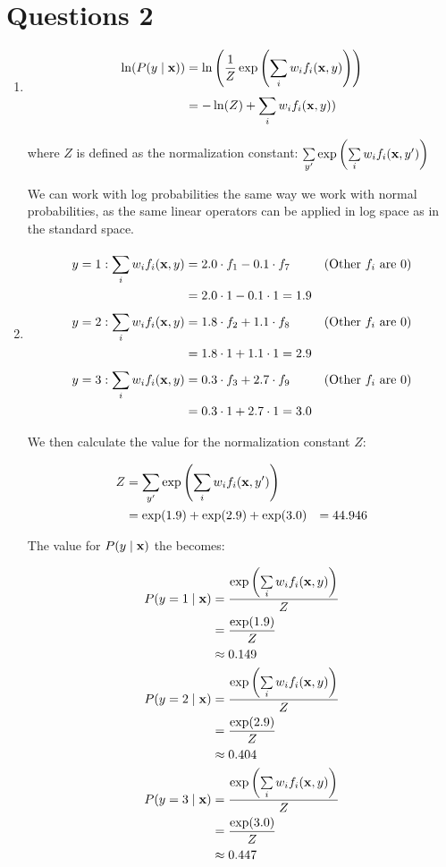 \documentclass[a4paper]{article}
\begin{document}
\section*{Questions 2}
\begin{enumerate}
    \item

\begin{align}
    \ln (P(y \mid\mathbf{x})) &= \ln \left(\frac{1}{Z}\exp\left(\sum\limits_{i}^{}w_if_i(\mathbf{x}, y)\right)\right)\\
    &=-\ln(Z) + \sum\limits_{i}^{}w_if_i(\mathbf{x}, y))\\
\end{align}

where $Z$ is defined as the normalization constant:
$\sum\limits_{y'}^{}\exp\left(\sum\limits_{i}^{}w_if_i(\mathbf{x}, y')\right)$

We can work with log probabilities the same way we work with normal probabilities, as the same linear operators can be applied in log space as in the standard space.

\item
    \begin{align}
        y=1 :\sum\limits_{i}^{}w_if_i(\mathbf{x}, y) &= 2.0\cdot f_1 -0.1\cdot f_7 &(\text{Other $f_i$ are 0})\\
        &= 2.0\cdot 1 -0.1\cdot 1= 1.9\\
        y=2 :\sum\limits_{i}^{}w_if_i(\mathbf{x}, y) &= 1.8\cdot f_2 + 1.1\cdot f_8 &(\text{Other $f_i$ are 0})\\
        &= 1.8\cdot 1 + 1.1\cdot 1= 2.9\\
        y=3 :\sum\limits_{i}^{}w_if_i(\mathbf{x}, y) &= 0.3\cdot f_3 + 2.7\cdot f_9 &(\text{Other $f_i$ are 0})\\
        &= 0.3\cdot 1 + 2.7\cdot 1= 3.0
    \end{align}

    We then calculate the value for the normalization constant $Z$:

    \begin{align}
        Z &= \sum\limits_{y'}^{}\exp\left(\sum\limits_{i}^{}w_if_i(\mathbf{x}, y')\right)\\
        &= \exp(1.9) + \exp(2.9) + \exp(3.0)
        &= 44.946
    \end{align}

    The value for $P(y\mid\mathbf{x})$ the becomes:

    \begin{align}
        P(y=1\mid\mathbf{x}) &= \frac{\exp\left(\sum\limits_{i}w_if_i(\mathbf{x}, y)\right)}{Z}\\
        &= \frac{\exp(1.9)}{Z}\\
        &\approx 0.149\\
        P(y=2\mid\mathbf{x}) &= \frac{\exp\left(\sum\limits_{i}^{}w_if_i(\mathbf{x}, y)\right)}{Z}\\
        &= \frac{\exp(2.9)}{Z}\\
        &\approx 0.404\\
        P(y=3\mid\mathbf{x}) &= \frac{\exp\left(\sum\limits_{i}^{}w_if_i(\mathbf{x}, y)\right)}{Z}\\
        &= \frac{\exp(3.0)}{Z}\\
        &\approx 0.447
    \end{align}

\end{enumerate}
\end{document}
